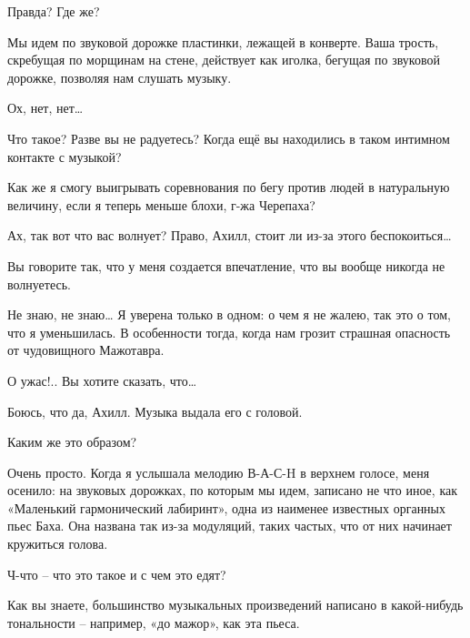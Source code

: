 \documentclass[../main.tex]{subfiles}
\begin{document}
\begin{Dialogue}
\begin{sublevel}
\begin{sublevel}
\begin{sublevel}

 Правда? Где же?

 Мы идем по звуковой дорожке пластинки, лежащей в конверте. Ваша трость, скребущая по морщинам на стене, действует как иголка, бегущая по звуковой дорожке, позволяя нам слушать музыку.

 Ох, нет, нет\ldots{}

 Что такое? Разве вы не радуетесь? Когда ещё вы находились в таком интимном контакте с музыкой?

 Как же я смогу выигрывать соревнования по бегу против людей в натуральную величину, если я теперь меньше блохи, г-жа Черепаха?

 Ах, так вот что вас волнует? Право, Ахилл, стоит ли из-за этого беспокоиться\ldots{}

 Вы говорите так, что у меня создается впечатление, что вы вообще никогда не волнуетесь.

 Не знаю, не знаю\ldots{} Я уверена только в одном: о чем я не жалею, так это о том, что я уменьшилась. В особенности тогда, когда нам грозит страшная опасность от чудовищного Мажотавра.

 О ужас!.. Вы хотите сказать, что\ldots{}

 Боюсь, что да, Ахилл. Музыка выдала его с головой.

 Каким же это образом?

 Очень просто. Когда я услышала мелодию В-А-С-H в верхнем голосе, меня осенило: на звуковых дорожках, по которым мы идем, записано не что иное, как «Маленький гармонический лабиринт», одна из наименее известных органных пьес Баха. Она названа так из-за модуляций, таких частых, что от них начинает кружиться голова.

 Ч-что \--- что это такое и с чем это едят?

 Как вы знаете, большинство музыкальных произведений написано в какой-нибудь тональности \--- например, «до мажор», как эта пьеса.


\end{sublevel}
\end{sublevel}
\end{sublevel}
\end{Dialogue}
\end{document}
